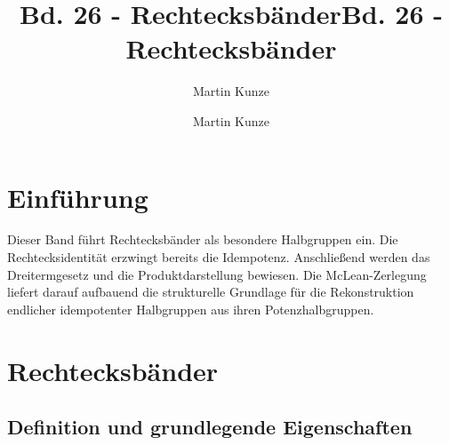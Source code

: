 \documentclass[main.tex]{subfiles}
\title{Bd. 26 - Rechtecksbänder}
\author{Martin Kunze}
\date{}
\begin{document}
\title{Bd. 26 - Rechtecksbänder}
\author{Martin Kunze}
\date{}
\hypersetup{pageanchor=false}
\maketitle
\hypersetup{pageanchor=true}
\setcounter{tocdepth}{3}
\tableofcontents
\setcounter{file}{26}
\renewcommand{\FormulaBandID}{26}

\chapter{Einführung}

Dieser Band führt Rechtecksbänder als besondere Halbgruppen ein. Die
Rechtecksidentität erzwingt bereits die Idempotenz. Anschließend werden das
Dreitermgesetz und die Produktdarstellung bewiesen. Die McLean-Zerlegung
liefert darauf aufbauend die strukturelle Grundlage für die Rekonstruktion
endlicher idempotenter Halbgruppen aus ihren Potenzhalbgruppen.

\chapter{Rechtecksbänder}

\section{Definition und grundlegende Eigenschaften}


\end{document}
